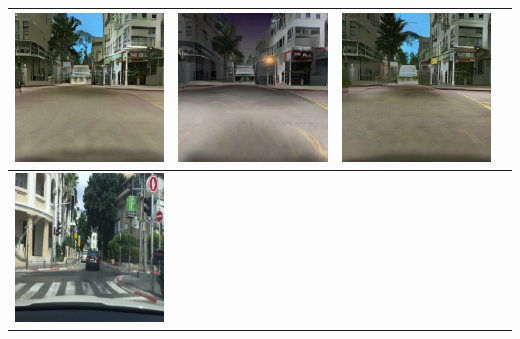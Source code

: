 \documentclass{VUMIFPSbakalaurinis}
\begin{document}
\begin{table}[H]
{\begin{tabular}{|c|c|c|c|}
            \includegraphics[scale=0.35]{img/pvz/4_cycle_v2} & \includegraphics[scale=0.35]{img/pvz/4_cut_v2} & \includegraphics[scale=0.35]{img/pvz/4_mspc_v2}
            \\
            \hline
            \includegraphics[scale=0.35]{img/pvz/5_real} & 

\end{tabular}}
\end{table}
\end{document}
